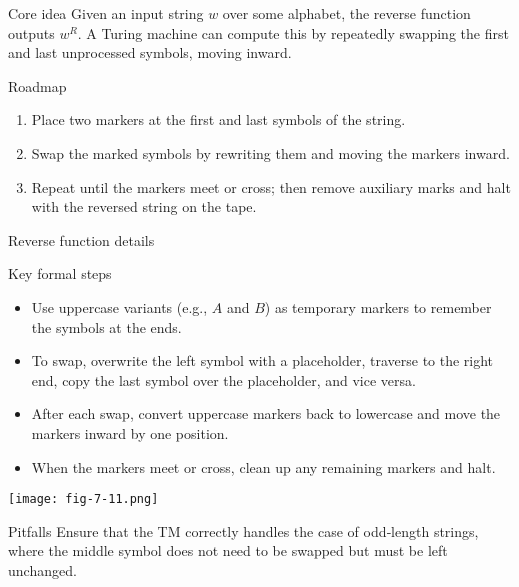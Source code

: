 \begin{frame}[t]{}
  \begin{tblock}{Core idea}
    Given an input string $w$ over some alphabet, the reverse function
    outputs $w^R$.  A Turing machine can compute this by repeatedly
    swapping the first and last unprocessed symbols, moving inward.
  \end{tblock}
  \begin{tblock}{Roadmap}
    \begin{enumerate}
      \item Place two markers at the first and last symbols of the
        string.
      \item Swap the marked symbols by rewriting them and moving the
        markers inward.
      \item Repeat until the markers meet or cross; then remove
        auxiliary marks and halt with the reversed string on the tape.
    \end{enumerate}
  \end{tblock}
  \label{fr:7.3-04}
\end{frame}

\begin{frame}[t]{Reverse function details}
  \begin{tblock}{Key formal steps}
    \begin{itemize}
      \item Use uppercase variants (e.g., $A$ and $B$) as temporary
        markers to remember the symbols at the ends.
      \item To swap, overwrite the left symbol with a placeholder,
        traverse to the right end, copy the last symbol over the
        placeholder, and vice versa.
      \item After each swap, convert uppercase markers back to
        lowercase and move the markers inward by one position.
      \item When the markers meet or cross, clean up any remaining
        markers and halt.
    \end{itemize}
  \end{tblock}
  \centering
  \texttt{[image: fig-7-11.png]} %
  \begin{talert}{Pitfalls}
    Ensure that the TM correctly handles the case of odd‑length
    strings, where the middle symbol does not need to be swapped but
    must be left unchanged.
  \end{talert}
  \label{fr:7.3-05}
\end{frame}

